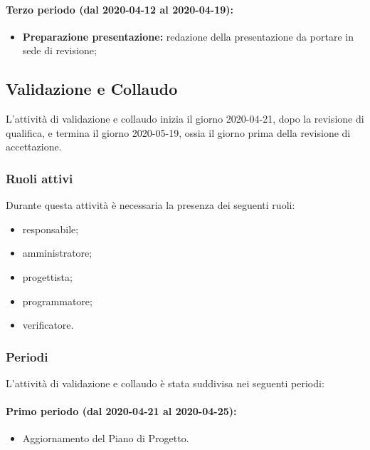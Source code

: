 				\paragraph{Terzo periodo (dal 2020-04-12 al 2020-04-19):}
				
					\begin{itemize}
						\item \textbf{Preparazione presentazione:} redazione della presentazione da portare in sede di revisione;
					\end{itemize}
		
		\subsection{Validazione e Collaudo}	
			
			L'attività di validazione e collaudo inizia il giorno 2020-04-21, dopo la revisione di qualifica, e termina il giorno 2020-05-19, ossia il giorno prima della revisione di accettazione.
			
			\subsubsection{Ruoli attivi}
			
			Durante questa attività è necessaria la presenza dei seguenti ruoli:
			\begin{itemize}
				\item responsabile;
				\item amministratore;
				\item progettista;
				\item programmatore;
				\item verificatore.
			\end{itemize}
			
			\subsubsection{Periodi}
			
				L'attività di validazione e collaudo è stata suddivisa nei seguenti periodi:
		
				\paragraph{Primo periodo (dal 2020-04-21 al 2020-04-25):}
				
					\begin{itemize}
					 	\item Aggiornamento del Piano di Progetto.
					\end{itemize} 	
				

